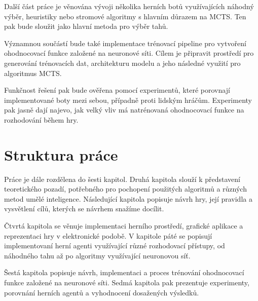 Další část práce je věnována vývoji několika herních botů využívajících náhodný výběr, heuristiky nebo stromové algoritmy
s hlavním důrazem na MCTS. Ten pak bude sloužit jako hlavní metoda pro výběr tahů.

Významnou součástí bude také implementace trénovací pipeline pro vytvoření ohodnocovací funkce založené na neuronové síti.
Cílem je připravit prostředí pro generování trénovacích dat, architekturu modelu a jeho následné využití pro algoritmus MCTS.

Funkčnost řešení pak bude ověřena pomocí experimentů, které porovnají implementované boty mezi sebou, případně proti
lidským hráčům. Experimenty pak jasně dají najevo, jak velký vliv má natrénovaná ohodnocovací funkce na rozhodování
během hry.

\section*{Struktura práce}

Práce je dále rozdělena do šesti kapitol. Druhá kapitola slouží k představení teoretického pozadí, potřebného pro pochopení použitých algoritmů
a různých metod umělé inteligence. Následující kapitola popisuje návrh hry, její pravidla a vysvětlení cílů, kterých se návrhem snažíme docílit.

Čtvrtá kapitola se věnuje implementaci herního prostředí, grafické aplikace a reprezentaci hry v elektronické podobě. V kapitole páté se popisují 
implementovaní herní agenti využívající různé rozhodovací přístupy, od náhodného tahu až po algoritmy využívající neuronovou síť.

Šestá kapitola popisuje návrh, implementaci a proces trénování ohodnocovací funkce založené na neuronové síti. Sedmá kapitola pak prezentuje
experimenty, porovnání herních agentů a vyhodnocení dosažených výsledků.


